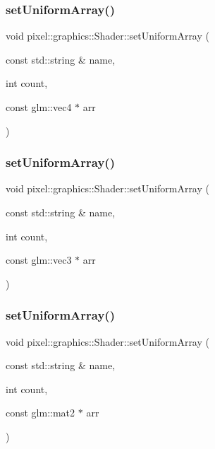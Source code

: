 \subsubsection{\texorpdfstring{set\+Uniform\+Array()}{setUniformArray()}\hspace{0.1cm}{\footnotesize\ttfamily [4/8]}}
{\footnotesize\ttfamily void pixel\+::graphics\+::\+Shader\+::set\+Uniform\+Array (\begin{DoxyParamCaption}\item[{const std\+::string \&}]{name,  }\item[{int}]{count,  }\item[{const glm\+::vec4 $\ast$}]{arr }\end{DoxyParamCaption})}

\mbox{\label{classpixel_1_1graphics_1_1_shader_ac8eed10293e5763e17e846a6399a73d7}} 
\subsubsection{\texorpdfstring{set\+Uniform\+Array()}{setUniformArray()}\hspace{0.1cm}{\footnotesize\ttfamily [5/8]}}
{\footnotesize\ttfamily void pixel\+::graphics\+::\+Shader\+::set\+Uniform\+Array (\begin{DoxyParamCaption}\item[{const std\+::string \&}]{name,  }\item[{int}]{count,  }\item[{const glm\+::vec3 $\ast$}]{arr }\end{DoxyParamCaption})}

\mbox{\label{classpixel_1_1graphics_1_1_shader_ab66ec7a2709728f850cbf58c95ede200}} 
\subsubsection{\texorpdfstring{set\+Uniform\+Array()}{setUniformArray()}\hspace{0.1cm}{\footnotesize\ttfamily [6/8]}}
{\footnotesize\ttfamily void pixel\+::graphics\+::\+Shader\+::set\+Uniform\+Array (\begin{DoxyParamCaption}\item[{const std\+::string \&}]{name,  }\item[{int}]{count,  }\item[{const glm\+::mat2 $\ast$}]{arr }\end{DoxyParamCaption})}

